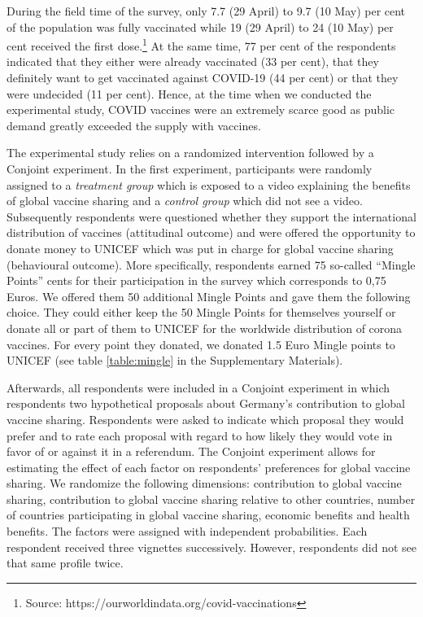\documentclass[12pt,oneside,smallheadings,chapterprefix=true]{article}
\begin{document}
During the field time of the survey, only 7.7 (29 April) to 9.7 (10 May) per cent of the population was fully vaccinated while 19 (29 April) to 24 (10 May) per cent received the first dose.\footnote{Source: https://ourworldindata.org/covid-vaccinations} At the same time, 77 per cent of the respondents indicated that they either were already vaccinated (33 per cent), that they definitely want to get vaccinated against COVID-19 (44 per cent) or that they were undecided (11 per cent). Hence, at the time when we conducted the experimental study, COVID vaccines were an extremely scarce good as public demand greatly exceeded the supply with vaccines. 

The experimental study relies on a randomized intervention followed by a Conjoint experiment. In the first experiment, participants were randomly assigned to a \emph{treatment group} which is exposed to a video explaining the benefits of global vaccine sharing and a \emph{control group} which did not see a video. Subsequently respondents were questioned whether they support the international distribution of vaccines (attitudinal outcome) and were offered the opportunity to donate money to UNICEF which was put in charge for global vaccine sharing (behavioural outcome). More specifically, respondents earned 75 so-called "`Mingle Points"' cents for their participation in the survey which corresponds to 0,75 Euros. We offered them  50 additional Mingle Points and gave them the following choice. They could either keep the 50 Mingle Points for themselves yourself or donate all or part of them to UNICEF for the worldwide distribution of corona vaccines. For every point they donated, we donated 1.5 Euro Mingle points to UNICEF (see table \ref{table:mingle} in the Supplementary Materials).

Afterwards, all respondents were included in a Conjoint experiment in which respondents two hypothetical proposals about Germany's contribution to global vaccine sharing. Respondents were asked  to indicate which proposal they would prefer and to rate each proposal with regard to how likely they would vote in favor of or against it in a referendum. The Conjoint experiment allows for estimating the effect of each factor on respondents' preferences for global vaccine sharing. We randomize the following dimensions: contribution to global vaccine sharing, contribution to global vaccine sharing relative to other countries, number of countries participating in global vaccine sharing, economic benefits and health benefits. The factors were assigned with independent probabilities. Each respondent received three vignettes successively. However, respondents did not see that same profile twice. 
\end{document}
